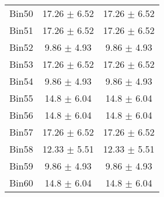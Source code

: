 \begin{tabular}{|c|c|c|}
     Bin50 & 17.26 $\pm$ 6.52 & 17.26 $\pm$ 6.52 \\ \cline{1-3} 
     Bin51 & 17.26 $\pm$ 6.52 & 17.26 $\pm$ 6.52 \\ \cline{1-3} 
     Bin52 & 9.86 $\pm$ 4.93 & 9.86 $\pm$ 4.93 \\ \cline{1-3} 
     Bin53 & 17.26 $\pm$ 6.52 & 17.26 $\pm$ 6.52 \\ \cline{1-3} 
     Bin54 & 9.86 $\pm$ 4.93 & 9.86 $\pm$ 4.93 \\ \cline{1-3} 
     Bin55 & 14.8 $\pm$ 6.04 & 14.8 $\pm$ 6.04 \\ \cline{1-3} 
     Bin56 & 14.8 $\pm$ 6.04 & 14.8 $\pm$ 6.04 \\ \cline{1-3} 
     Bin57 & 17.26 $\pm$ 6.52 & 17.26 $\pm$ 6.52 \\ \cline{1-3} 
     Bin58 & 12.33 $\pm$ 5.51 & 12.33 $\pm$ 5.51 \\ \cline{1-3} 
     Bin59 & 9.86 $\pm$ 4.93 & 9.86 $\pm$ 4.93 \\ \cline{1-3} 
     Bin60 & 14.8 $\pm$ 6.04 & 14.8 $\pm$ 6.04 \\ \cline{1-3} 
  \end{tabular}
